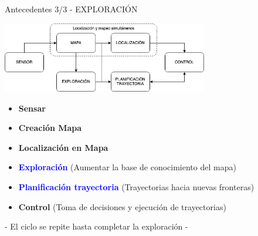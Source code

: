 \documentclass[
  24pt, %
  aspectratio=169, %
]{beamer}
\begin{document}
\begin{frame}{Antecedentes 3/3 - EXPLORACIÓN}
  
  \centering
  \includegraphics[width=9cm]{exploracion}\\
  
  \begin{itemize}
  \item \textbf{Sensar}
  \item \textbf{Creación Mapa} 
  \item \textbf{Localización en Mapa}
  \item \textbf{\textcolor{blue}{Exploración}} (Aumentar la base de conocimiento del mapa)
  \item \textbf{\textcolor{blue}{Planificación trayectoria}} (Trayectorias hacia nuevas fronteras) 
  \item \textbf{Control} (Toma de decisiones y ejecución de trayectorias)
  \end{itemize}

  \alert{- El ciclo se repite hasta completar la exploración -}
  
\end{frame}
\end{document}
